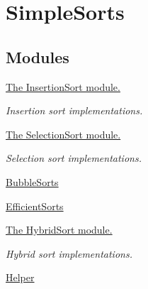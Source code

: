 \hypertarget{group__SimpleSorts}{}\section{Simple\+Sorts}
\label{group__SimpleSorts}
\subsection*{Modules}
\begin{DoxyCompactItemize}
\item 
\hyperlink{group__InsertionSort}{The Insertion\+Sort module.}
\begin{DoxyCompactList}\small\item\em Insertion sort implementations. \end{DoxyCompactList}\item 
\hyperlink{group__SelectionSort}{The Selection\+Sort module.}
\begin{DoxyCompactList}\small\item\em Selection sort implementations. \end{DoxyCompactList}\item 
\hyperlink{group__BubbleSorts}{Bubble\+Sorts}
\item 
\hyperlink{group__EfficientSorts}{Efficient\+Sorts}
\item 
\hyperlink{group__HybridSort}{The Hybrid\+Sort module.}
\begin{DoxyCompactList}\small\item\em Hybrid sort implementations. \end{DoxyCompactList}\item 
\hyperlink{group__Helper}{Helper}
\end{DoxyCompactItemize}
